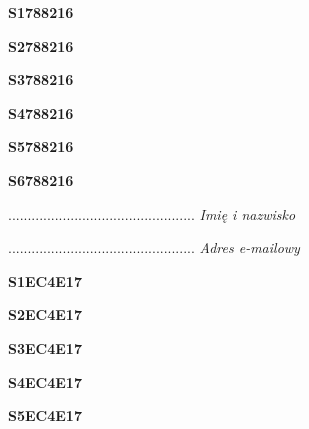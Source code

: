 \begin{turn}{90}\huge \textbf{S1788216}\end{turn}

\begin{turn}{90}\huge \textbf{S2788216}\end{turn}

\begin{turn}{90}\huge \textbf{S3788216}\end{turn}

\begin{turn}{90}\huge \textbf{S4788216}\end{turn}

\begin{turn}{90}\huge \textbf{S5788216}\end{turn}

\begin{turn}{90}\huge \textbf{S6788216}\end{turn}

\begin{turn}{90}\begin{minipage}{\linewidth} \vspace{20mm} ................................................  \textit{Imię i nazwisko}\end{minipage}\end{turn}

\begin{turn}{90}\begin{minipage}{\linewidth} \vspace{20mm} ................................................  \textit{Adres e-mailowy}\end{minipage}\end{turn}

\begin{turn}{90}\huge \textbf{S1EC4E17}\end{turn}

\begin{turn}{90}\huge \textbf{S2EC4E17}\end{turn}

\begin{turn}{90}\huge \textbf{S3EC4E17}\end{turn}

\begin{turn}{90}\huge \textbf{S4EC4E17}\end{turn}

\begin{turn}{90}\huge \textbf{S5EC4E17}\end{turn}

